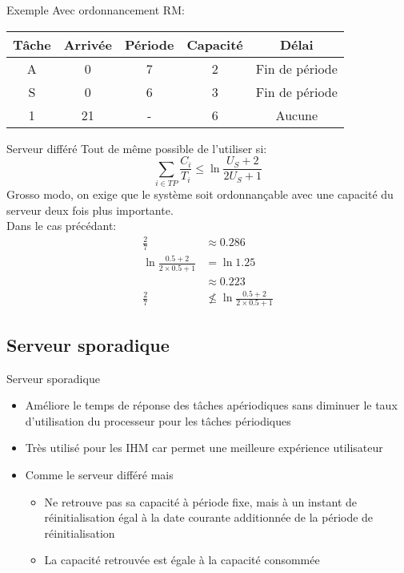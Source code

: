 \begin{frame}{Exemple}
  Avec ordonnancement RM:
  \begin{center}
    \begin{tabular}{ccccc}
      \hline
      Tâche & Arrivée & Période & Capacité & Délai \\
      \hline
      A &  0 & 7 & 2 & Fin de période\\
      S &  0 & 6 & 3 & Fin de période\\
      1 & 21 & - & 6 & Aucune\\
      \hline
    \end{tabular}
    \pause
    
  \end{center}
\end{frame}

\begin{frame}{Serveur différé}
  Tout de même possible de l'utiliser si:
  $$\sum_{i \in TP} \frac{C_i}{T_i} ≤ \ln \frac{U_S + 2}{2U_S + 1}$$
  Grosso modo,  on exige  que le système  soit ordonnançable  avec une
  capacité du serveur deux fois plus importante.\\
  \pause
  Dans le cas précédant:
  \begin{align*}
    \frac{2}{7} &≈ 0.286\\
    \ln \frac{0.5 + 2}{2 \times 0.5 + 1} &=  \ln 1.25 \\
         &≈ 0.223\\
    \frac{2}{7} &\nleq \ln \frac{0.5 + 2}{2 \times 0.5 + 1}
  \end{align*}
\end{frame}

\subsection{Serveur sporadique}

\begin{frame}{Serveur sporadique}
  \begin{itemize}
  \item  Améliore le  temps de  réponse des  tâches  apériodiques sans
    diminuer  le  taux d'utilisation  du  processeur  pour les  tâches
    périodiques
  \item Très utilisé pour les  IHM car permet une meilleure expérience
    utilisateur
  \item Comme le serveur différé mais
    \begin{itemize}
    \item  Ne retrouve  pas  sa capacité  à  période fixe,  mais à  un
      instant de réinitialisation égal  à la date courante additionnée
      de la période de réinitialisation
      \item La capacité retrouvée est égale à la capacité consommée
      \end{itemize}
    \end{itemize}
\end{frame}

